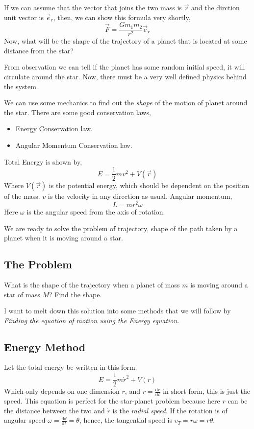 \documentclass[12pt,a4paper]{article}
\newcommand{ \pk }[1]{\begin{problem} #1 \end{problem} }
\begin{document}
If we can assume that the vector that joins the two mass is $\vec{r}$ and the dirction unit vector is $\vec{e}_r$, then, we can show this formula very shortly,
\[ 
\vec{F} = \frac{Gm_1m_2}{r^2} \vec{e}_r
\] 
Now, what will be the shape of the trajectory of a planet that is located at some distance from the star? 

From observation we can tell if the planet has some random initial speed, it will circulate around the star. Now, there must be a very well defined physics behind the system. 

We can use some mechanics to find out the \emph{shape} of the motion of planet around the star. There are some good conservation laws,
\begin{itemize}
    \item Energy Conservation law.
    \item Angular Momentum Conservation law.
\end{itemize}
Total Energy is shown by, 
\[ 
    E = \frac{1}{2} mv^2 + V(\vec{r})
\] 
Where $V(\vec{r})$ is the potential energy, which should be dependent on the position of the mass. $v$ is the velocity in any direction as usual. Angular momentum,
\[ 
L = mr^2 \omega
\] 
Here $\omega$ is the angular speed from the axis of rotation. 

We are ready to solve the problem of trajectory, shape of the path taken by a planet when it is moving around a star. 


\subsection{ The Problem }
\pk{ What is the shape of the trajectory when a planet of mass $m$ is moving around a star of mass $M $? Find the shape. }

I want to melt down this solution into some methods that we will follow by \emph{Finding the equation of motion using the Energy equation.}

\subsection{ Energy Method }
Let the total energy be written in this form. 
\[ 
    E = \frac{1}{2} m \dot{r}^2 + V(r)
\] Which only depends on one dimension $r$, and $ \dot{r} = \frac{\mathrm{d} r}{\mathrm{d} t}$ in short form, this is just the speed. This equation is perfect for the star-planet problem because here $r$ can be the distance between the two and $ \dot{r}$ is the \emph{radial speed}. If the rotation is of angular speed $\omega = \frac{\mathrm{d} \theta}{\mathrm{d} t} = \dot{\theta}$, hence, the tangential speed is $v_T = r\omega = r \dot{\theta}$.
\end{document}
